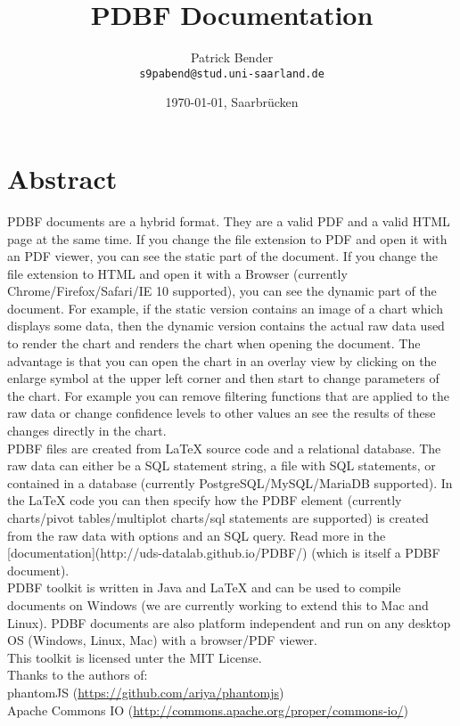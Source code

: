 \documentclass[11pt]{scrartcl}
\title{PDBF Documentation}
\author{
 Patrick Bender\\
  \texttt{s9pabend@stud.uni-saarland.de}
}
\date{\today{}, Saarbrücken}
\begin{document}
\maketitle

\section{Abstract}
PDBF documents are a hybrid format. They are a valid PDF and a valid HTML page at the same time. 
If you change the file extension to PDF and open it with an PDF viewer, you can see the static part of the document. If you change the file extension to HTML and open it with a Browser (currently Chrome/Firefox/Safari/IE 10 supported), you can see the dynamic part of the document. For example, if the static version contains an image of a chart which displays some data, then the dynamic version contains the actual raw data used to render the chart and renders the chart when opening the document. The advantage is that you can open the chart in an overlay view by clicking on the enlarge symbol at the upper left corner and then start to change parameters of the chart. For example you can remove filtering functions that are applied to the raw data or change confidence levels to other values an see the results of these changes directly in the chart. \\[4pt]
%
\noindent PDBF files are created from LaTeX source code and a relational database. The raw data can either be a SQL statement string, a file with SQL statements, or contained in a database (currently PostgreSQL/MySQL/MariaDB supported). In the LaTeX code you can then specify how the PDBF element (currently charts/pivot tables/multiplot charts/sql statements are supported) is created from the raw data with options and an SQL query. Read more in the [documentation](http://uds-datalab.github.io/PDBF/) (which is itself a PDBF document).\\[4pt]
%
\noindent PDBF toolkit is written in Java and LaTeX and can be used to compile documents on Windows (we are currently working to extend this to Mac and Linux). PDBF documents are also platform independent and run on any desktop OS (Windows, Linux, Mac) with a browser/PDF viewer.\\[4pt]
%
\noindent This toolkit is licensed unter the MIT License.\\[4pt]
%
\noindent Thanks to the authors of:\\
phantomJS (\url{https://github.com/ariya/phantomjs})\\
Apache Commons IO (\url{http://commons.apache.org/proper/commons-io/})\\
\end{document}
